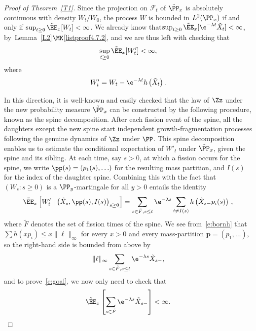 \begin{proof}[Proof of Theorem~\ref{T1}]
Since the projection on ${\mathcal F}_t$ of $\tilde \PP_x$ is absolutely continuous with density $W_t/W_0$, the process $W$ is bounded in $L^2(\PP_x)$ if and only if $
\sup_{t\geq 0} \tilde \EE_x [W_t] <\infty$. We already know that$\sup_{t\geq 0} \tilde \EE_x [\e^{-\lambda t} \tilde X_t] <\infty$, by~Lemma~\ref{L2}$\MK$\eqref{listproof4.7.2}, and we are thus left with checking that
\begin{equation}\label{e:goal}
\sup_{t\geq 0} \tilde \EE_x [W'_t] <\infty,
\end{equation}
where
\[
W'_t=W_t-\e^{-\lambda t} h\left(\tilde X_t\right).
\]

In this direction, it is well-known and easily checked that the law of $\Zz$ under the new probability measure $\tilde{\PP}_x$ can be constructed by the following procedure, known as the spine decomposition. After each fission event of the spine, all the daughters except the new spine start independent growth-fragmentation processes following the genuine dynamics of $\Zz$ under $\PP$. This spine decomposition enables us to estimate the conditional expectation of $W'_t$ under $\tilde \PP_x$, given the spine and its sibling. At each time, say $s>0$, at which a fission occurs for the spine, we write $\pp(s)=(p_1(s), \ldots)$ for the resulting mass partition, and $I(s)$ for the index of the daughter spine. Combining this with the fact that $(W_s: s\geq 0)$ is a $\PP_y$-martingale for all $y>0$ entails the identity
\[
\tilde \EE_x\left[W'_t\mid \left(\tilde X_s, \pp(s), I(s)\right)_{s\geq 0}\right] =
\sum_{s\in \tilde F, s\leq t} \e^{-\lambda s} \sum_{i\neq I(s)} h\left(\tilde X_{s-} p_i(s)\right)\,,
\]
where $\tilde F$ denotes the set of fission times of the spine. We see from~\eqref{e:bornh} that $\sum h(xp_i) \leq x \| \ell\|_{\infty}$ for every $x>0$ and every mass-partition ${\mathbf p}=(p_1, \ldots)$, so the right-hand side is bounded from above by
\[
\| \ell \|_{\infty} \sum_{s\in \tilde F, s\leq t} \e^{-\lambda s} \tilde X_{s-},
\]
and to prove~\eqref{e:goal}, we now only need to check that
\[
\tilde \EE_x \left[\sum_{s\in \tilde F} \e^{-\lambda s} \tilde X_{s-}\right] <\infty.
\]


\end{proof}
